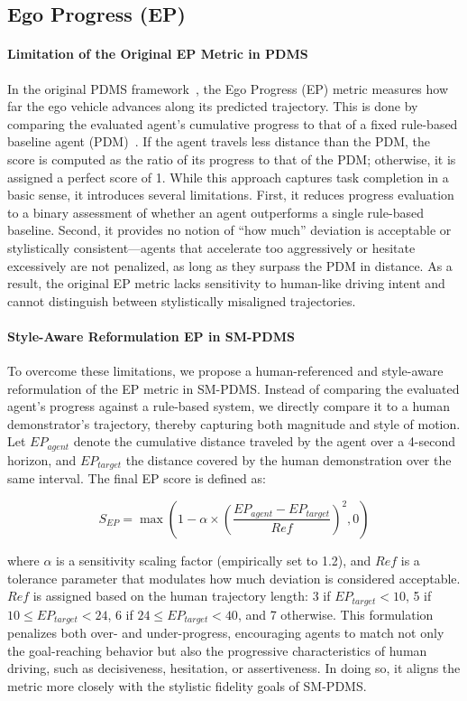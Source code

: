 \documentclass{article}
\begin{document}
\subsection{Ego Progress (EP)}
\paragraph{Limitation of the Original EP Metric in PDMS}
In the original PDMS framework~\cite{dauner2024navsim}, the Ego Progress (EP) metric measures how far the ego vehicle advances along its predicted trajectory. This is done by comparing the evaluated agent’s cumulative progress to that of a fixed rule-based baseline agent (PDM)~\cite{dauner2023parting}. If the agent travels less distance than the PDM, the score is computed as the ratio of its progress to that of the PDM; otherwise, it is assigned a perfect score of 1. While this approach captures task completion in a basic sense, it introduces several limitations. First, it reduces progress evaluation to a binary assessment of whether an agent outperforms a single rule-based baseline. Second, it provides no notion of “how much” deviation is acceptable or stylistically consistent—agents that accelerate too aggressively or hesitate excessively are not penalized, as long as they surpass the PDM in distance. As a result, the original EP metric lacks sensitivity to human-like driving intent and cannot distinguish between stylistically misaligned trajectories.

\paragraph{Style-Aware Reformulation EP in SM-PDMS}
To overcome these limitations, we propose a human-referenced and style-aware reformulation of the EP metric in SM-PDMS. Instead of comparing the evaluated agent’s progress against a rule-based system, we directly compare it to a human demonstrator’s trajectory, thereby capturing both magnitude and style of motion. Let $EP_{agent}$ denote the cumulative distance traveled by the agent over a 4-second horizon, and $EP_{target}$ the distance covered by the human demonstration over the same interval. The final EP score is defined as:

\begin{equation}
S_{EP} = \max\left(1 - \alpha \times \left(\frac{EP_{agent} - EP_{target}}{Ref}\right)^2, 0\right)
\end{equation}

\noindent where $\alpha$ is a sensitivity scaling factor (empirically set to 1.2), and $Ref$ is a tolerance parameter that modulates how much deviation is considered acceptable. $Ref$ is assigned based on the human trajectory length: 3 if $EP_{target} < 10$, 5 if $10 \leq EP_{target} < 24$, 6 if $24 \leq EP_{target} < 40$, and 7 otherwise. This formulation penalizes both over- and under-progress, encouraging agents to match not only the goal-reaching behavior but also the progressive characteristics of human driving, such as decisiveness, hesitation, or assertiveness. In doing so, it aligns the metric more closely with the stylistic fidelity goals of SM-PDMS.
\end{document}
